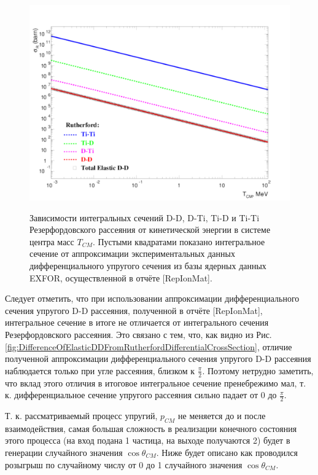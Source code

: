 \documentclass[a4paper,12pt]{article}
\begin{document}
\begin{large}
\begin{figure}[ht]
  {
     \includegraphics[width=0.99\linewidth]{images/integral_rutherford_d_ti_cross_sections.pdf}
  }
  \caption{Зависимости интегральных сечений D-D, D-Ti, Ti-D и Ti-Ti Резерфордовского рассеяния от кинетической энергии в системе центра масс $T_{CM}$. Пустыми квадратами показано интегральное сечение от аппроксимации экспериментальных данных дифференциального упругого сечения из базы ядерных данных EXFOR, осуществленной в отчёте [RepIonMat].}
  \label{fig:IntegralRutherfordDTiCrossSections}
\end{figure}

	Следует отметить, что при использовании аппроксимации дифференциального сечения упругого D-D рассеяния, полученной в отчёте [RepIonMat], интегральное сечение в итоге не отличается от интегрального сечения Резерфордовского рассеяния.
	Это связано с тем, что, как видно из Рис. ~    \ref{fig:DifferenceOfElasticDDFromRutherfordDifferentialCrossSection}, отличие полученной аппроксимации дифференциального сечения упругого D-D рассеяния наблюдается только при угле рассеяния, близком к $\frac{\pi}{2}$.
	Поэтому нетрудно заметить, что вклад этого отличия в итоговое интегральное сечение пренебрежимо мал, т. к. дифференциальное сечение упругого рассеяния сильно падает от 0 до $\frac{\pi}{2}$.
	
	Т. к. рассматриваемый процесс упругий, $p_{CM}$ не меняется до и после взаимодействия, самая большая сложность в реализации конечного состояния этого процесса (на вход подана 1 частица, на выходе получаются  2) будет в генерации случайного значения $\cos{\theta_{CM}}$.
	Ниже будет описано как проводился розыгрыш по случайному числу от 0 до 1 случайного значения $\cos{\theta_{CM}}$.
	

\end{large}
\end{document}
